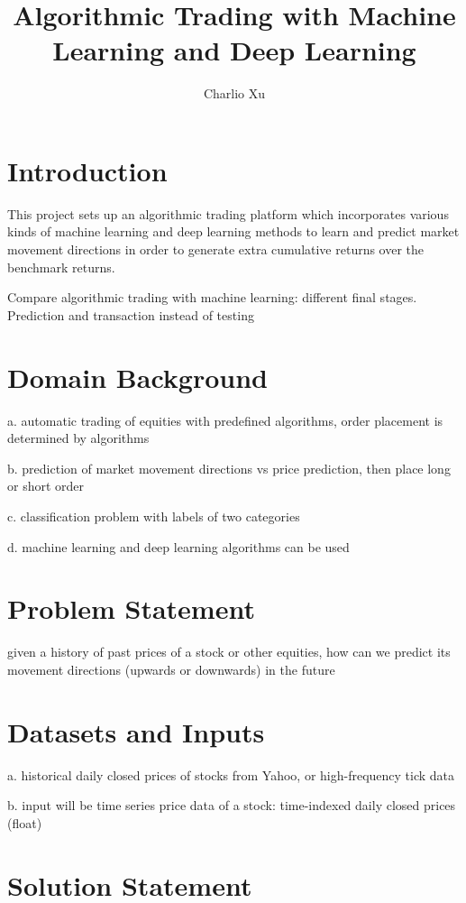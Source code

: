 \documentclass[11pt]{article} %
\title{Algorithmic Trading with Machine Learning and Deep Learning}
\author{Charlio Xu}
\begin{document}
\maketitle

\section{Introduction}
This project sets up an algorithmic trading platform which incorporates various kinds of machine learning and deep learning methods to learn and predict market movement directions in order to generate extra cumulative returns over the benchmark returns.

Compare algorithmic trading with machine learning: different final stages. Prediction and transaction instead of testing


\section{Domain Background}

a. automatic trading of equities with predefined algorithms, order placement is determined by algorithms 

b. prediction of market movement directions vs price prediction, then place long or short order

c. classification problem with labels of two categories

d. machine learning and deep learning algorithms can be used




\section{Problem Statement}

given a history of past prices of a stock or other equities, how can we predict its movement directions (upwards or downwards) in the future 


\section{Datasets and Inputs}

a. historical daily closed prices of stocks from Yahoo, or high-frequency tick data

b. input will be time series price data of a stock: time-indexed daily closed prices (float)


\section{Solution Statement}
\end{document}
